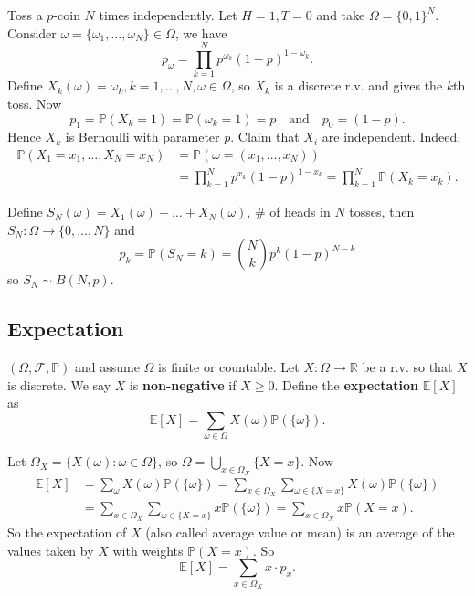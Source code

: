 \begin{example}
    Toss a $p$-coin $N$ times independently. Let $H=1,T=0$ and take $ \Omega=\{0,1\}^N $. Consider $ \omega = \{\omega_1,\dots,\omega_N\}\in \Omega $, we have 
    \[
        p_\omega = \prod_{k=1}^{N} p^{\omega_k} (1-p)^{1-\omega_k}.
    \]
    Define $ X_k(\omega)=\omega_k, k=1,\dots,N,\omega\in \Omega $, so $X_k$ is a discrete r.v. and gives the $k$th toss. Now 
    \[
        p_1 = \mathbb{P}(X_k=1) = \mathbb{P}(\omega_k=1)=p\quad \text{and}\quad p_0 = (1-p).
    \]
    Hence $X_k$ is Bernoulli with parameter $p$. Claim that $X_i$ are independent. Indeed, 
    \begin{align*}
        \mathbb{P}(X_1=x_1,\dots,X_N=x_N) &= \mathbb{P}(\omega = (x_1,\dots,x_N)) \\
        &= \prod_{k=1}^{N}p^{x_k} (1-p)^{1-x_k}=\prod_{k=1}^{N}\mathbb{P}(X_k=x_k).
    \end{align*}
\end{example}

Define $ S_N(\omega) = X_1(\omega)+\dots+X_N(\omega) $, \# of heads in $N$ tosses, then $ S_N:\Omega\to \{0,\dots,N\} $ and 
\[
    p_k=\mathbb{P}(S_N=k) = \binom{N}{k} p^k(1-p)^{N-k}
\]
so $S_N\sim B(N,p)$.

\subsection{Expectation}
\begin{definition}
    $ (\Omega,\mathscr{F},\mathbb{P}) $ and assume $\Omega$ is finite or countable. Let $ X:\Omega\to \mathbb{R}  $ be a r.v. so that $X$ is discrete. We say $X$ is \textbf{non-negative} if $ X\ge 0 $. Define the \textbf{expectation} $ \mathbb{E}[X] $ as 
    \[
        \mathbb{E}[X] = \sum_{\omega\in \Omega} X(\omega) \mathbb{P}(\{\omega\}).
    \]
\end{definition}

Let $ \Omega_X=\{X(\omega):\omega\in \Omega\} $, so $ \Omega = \bigcup_{x\in \Omega_X}\{X=x\} $. Now 
\begin{align*}
    \mathbb{E}[X]&=\sum_\omega X(\omega)\mathbb{P}(\{\omega\}) = \sum_{x\in \Omega_X} \sum_{\omega\in \{X=x\}}X(\omega)\mathbb{P}(\{\omega\})\\ 
    &=\sum_{x\in \Omega_X} \sum_{\omega\in \{X=x\}}x\mathbb{P}(\{\omega\})=\sum_{x\in \Omega_X}x \mathbb{P}(X=x).
\end{align*}
So the expectation of $X$ (also called average value or mean) is an average of the values taken by $X$ with weights $\mathbb{P}(X=x)$. So 
\[
    \mathbb{E}[X] = \sum_{x\in \Omega_X}x\cdot p_x.
\]


